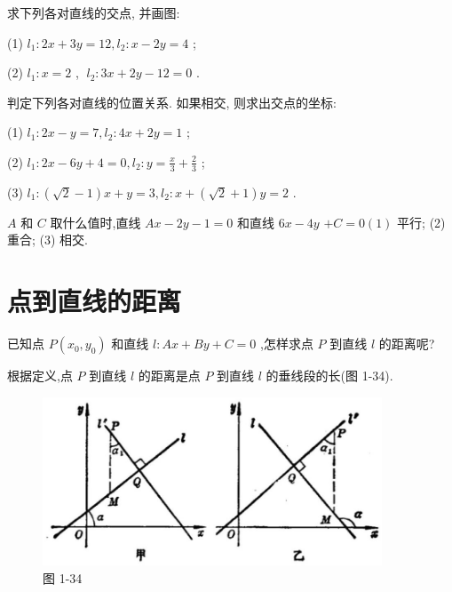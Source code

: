 \documentclass[lang=cn,newtx,10.5pt,scheme=chinese]{elegantbook}
\begin{document}
\begin{problemset}[练习]

\item 求下列各对直线的交点, 并画图:

(1) \({l}_{1} : {2x} + {3y} = {12},{l}_{2} : x - {2y} = 4\) ;

(2) \({l}_{1} : x = 2\) , \(\;{l}_{2} : {3x} + {2y} - {12} = 0\) .

\item 判定下列各对直线的位置关系. 如果相交, 则求出交点的坐标:

(1) \({l}_{1} : {2x} - y = 7,{l}_{2} : {4x} + {2y} = 1\) ;

(2) \({l}_{1} : {2x} - {6y} + 4 = 0,{l}_{2} : y = \frac{x}{3} + \frac{2}{3}\) ;

(3) \({l}_{1} : \left( {\sqrt{2} - 1}\right) x + y = 3,{l}_{2} : x + \left( {\sqrt{2} + 1}\right) y = 2\) .

\item \(A\) 和 \(C\) 取什么值时,直线 \({Ax} - {2y} - 1 = 0\) 和直线 \({6x} - {4y}\) \(+ C = 0\left( 1\right)\) 平行; (2) 重合; (3) 相交.

\end{problemset}

\section{点到直线的距离}

已知点 \(P\left( {{x}_{0},{y}_{0}}\right)\) 和直线 \(l : {Ax} + {By} + C = 0\) ,怎样求点 \(P\) 到直线 \(l\) 的距离呢?

根据定义,点 \(P\) 到直线 \(l\) 的距离是点 \(P\) 到直线 \(l\) 的垂线段的长(图 1-34).

\begin{figure}[h]
  \centering
  \includegraphics[max width=0.9\textwidth]{images/01912cc2-ffb6-728e-9ae7-b113ff05c64b_54_863018.jpg}
  \caption{图 1-34}
\end{figure}
\end{document}
